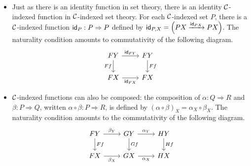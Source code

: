 \begin{itemize}
\item Just as there is an identity function in set theory,
  there is an identity \(\mathcal C\)-indexed function in \(\mathcal C\)-indexed set theory.
  For each \(\mathcal C\)-indexed set \(P\),
  there is a \(\mathcal C\)-indexed function \(\mathsf{id}_P : P \Rightarrow P\)
  defined by \(\mathsf{id}_{P,X} = \left(PX \xrightarrow{\mathsf{id}_{PX}} PX\right)\).
  The naturality condition amounts to commutativity of the following diagram.
  \[%
\begin{tikzcd}
FY \arrow[r, "\idt_{FY}"] \arrow[d, "Ff"'] & FY \arrow[d, "Ff"] \\
FX \arrow[r, "\idt_{FX}"']                 & FX
\end{tikzcd}\]
\item \(\mathcal C\)-indexed functions can also be composed:
  the composition of \(\alpha : Q \Rightarrow R\)
  and \(\beta: P \Rightarrow Q\),
  written \(\alpha\circ\beta : P \Rightarrow R\),
  is defined by \((\alpha\circ\beta)_X = \alpha_X \circ \beta_X\).
  The naturality condition amounts to the commutativity of the following diagram.
  \[
\begin{tikzcd}
FY \arrow[d, "Ff"] \arrow[r, "\beta_Y"] & GY \arrow[d, "Gf"] \arrow[r, "\alpha_Y"] & HY \arrow[d, "Hf"] \\
FX \arrow[r, "\beta_X"']                & GX \arrow[r, "\alpha_X"']                & HX
\end{tikzcd}
\]
\end{itemize}

